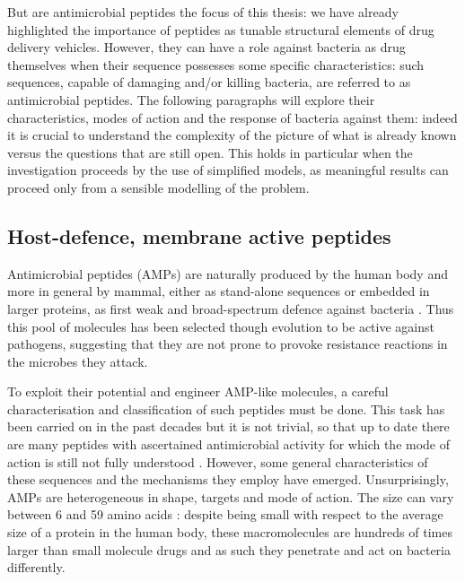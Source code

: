 But are antimicrobial peptides the focus of this thesis: we have already highlighted the importance of peptides as tunable structural elements of drug delivery vehicles. However, they can have a role against bacteria as drug themselves when their sequence possesses some specific characteristics: such sequences, capable of damaging and/or killing bacteria, are referred to as antimicrobial peptides. The following paragraphs will explore their characteristics, modes of action and the response of bacteria against them: indeed it is crucial to understand the complexity of the picture of what is already known versus the questions that are still open. This holds in particular when the investigation proceeds by the use of simplified models, as meaningful results can proceed only from a sensible  modelling of the problem.

\subsection{Host-defence, membrane active peptides}
Antimicrobial peptides (AMPs) are naturally produced by the human body and more in general by mammal, either as stand-alone sequences or embedded in larger proteins, as first weak and broad-spectrum defence against bacteria \cite{Nguyen2011,Bahar2013,Mahlapuu2016,Zhang2016}.
%
Thus this pool of molecules has been selected though evolution to be active against pathogens, suggesting that they are not prone to provoke resistance reactions in the microbes they attack.

To exploit their potential and engineer AMP-like molecules, a careful characterisation and classification of such peptides must be done. This task has been carried on in the past decades but it is not trivial, so that up to date there are many peptides with ascertained antimicrobial activity for which the mode of action is still not fully understood \cite{Ebbensgaard2015}. However, some general characteristics of these sequences and the mechanisms they employ have emerged.
%
Unsurprisingly, AMPs are heterogeneous in shape, targets and mode of action. The size can vary between 6 and 59 amino acids \cite{Brogden2005}: despite being small with respect to the average size of a protein in the human body, these macromolecules are hundreds of times larger than small molecule drugs and as such they penetrate and act on bacteria differently.

